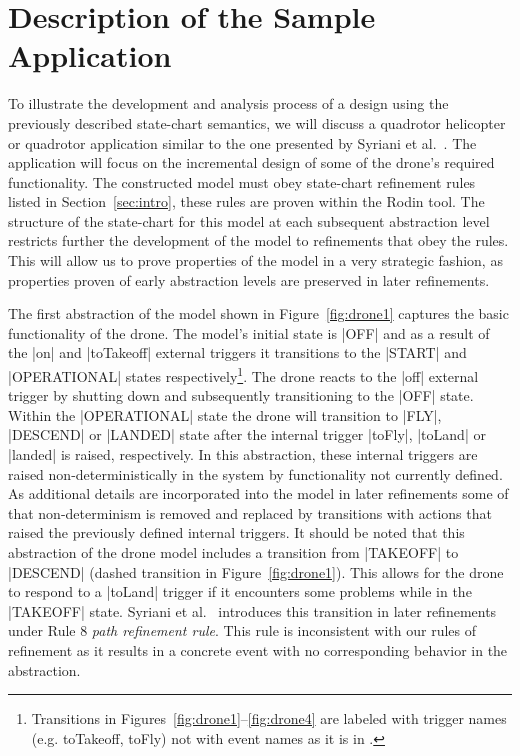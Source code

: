 \section{Description of the Sample Application}
\label{sec:descr-sample-appl}

To illustrate the development and analysis process of a design using the previously described 
state-chart semantics, we will discuss a quadrotor helicopter or quadrotor application similar to 
the one presented by Syriani et al.~\cite{Syriani_2019}. The application will focus on the incremental 
design of some of the drone's required functionality.
The constructed model must obey state-chart refinement rules listed in Section~\ref{sec:intro}, these rules are proven within the Rodin tool.
The structure of the state-chart for this model at each subsequent abstraction level restricts further the
development of the model to refinements that obey the rules. This will allow us to prove properties 
of the model in a very strategic fashion, as properties proven of early abstraction levels 
are preserved in later refinements.

The first abstraction of the model shown in Figure~\ref{fig:drone1} captures the basic 
functionality of the drone. The model's initial state is |OFF| and as a result of the |on| and 
|toTakeoff| external triggers it transitions to the |START| and |OPERATIONAL| states 
respectively\footnote{Transitions in Figures~\ref{fig:drone1}--\ref{fig:drone4} are labeled with trigger names
(e.g. toTakeoff, toFly) not with event names as it is in \UMLB.}. 
The drone reacts to the |off| external trigger by shutting down and subsequently transitioning to the |OFF| state.
Within the |OPERATIONAL| state the drone will transition to |FLY|, |DESCEND| or |LANDED| 
state after the internal trigger |toFly|, |toLand| or |landed| is raised, respectively. 
In this abstraction, these internal triggers are raised non-deterministically 
in the system by functionality not currently defined.
As additional details are incorporated into the model in later refinements some of that non-determinism is 
removed and replaced by transitions with actions that raised the previously defined internal triggers.
It should be noted that this abstraction of the drone model includes a transition 
from |TAKEOFF| to |DESCEND| (dashed transition in Figure~\ref{fig:drone1}). 
This allows for the drone to respond to a |toLand| trigger if it encounters some 
problems while in the |TAKEOFF| state. Syriani et al.~\cite{Syriani_2019} introduces this transition 
in later refinements under Rule 8 \emph{path refinement rule}. This rule is inconsistent with our rules 
of refinement as it results in a concrete event with no corresponding 
behavior in the abstraction.

